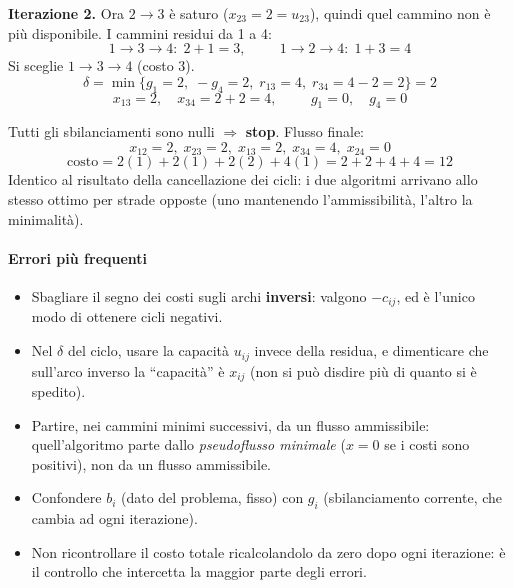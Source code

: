 \documentclass[12pt]{extarticle} %
\begin{document}
\noindent\textbf{Iterazione 2.} Ora $2\to3$ è saturo ($x_{23}=2=u_{23}$), quindi quel cammino non è più disponibile. I cammini residui da 1 a 4:
\[
1\to3\to4:\; 2+1 = 3, \hspace{1cm} 1\to2\to4:\; 1+3 = 4
\]
Si sceglie $1\to3\to4$ (costo 3).
\[
\delta = \min\{g_1 = 2,\; -g_4 = 2,\; r_{13} = 4,\; r_{34} = 4-2 = 2\} = 2
\]
\[
x_{13} = 2, \quad x_{34} = 2+2 = 4, \hspace{1cm} g_1 = 0, \quad g_4 = 0
\]
\begin{center}
\end{center}
Tutti gli sbilanciamenti sono nulli $\Rightarrow$ \textbf{stop}. Flusso finale:
\[
x_{12}=2,\; x_{23}=2,\; x_{13}=2,\; x_{34}=4,\; x_{24}=0
\]
\[
\text{costo} = 2(1) + 2(1) + 2(2) + 4(1) = 2 + 2 + 4 + 4 = 12
\]
Identico al risultato della cancellazione dei cicli: i due algoritmi arrivano allo stesso ottimo per strade opposte (uno mantenendo l'ammissibilità, l'altro la minimalità).

\paragraph{Errori più frequenti}
\begin{itemize}
    \item Sbagliare il segno dei costi sugli archi \textbf{inversi}: valgono $-c_{ij}$, ed è l'unico modo di ottenere cicli negativi.
    \item Nel $\delta$ del ciclo, usare la capacità $u_{ij}$ invece della residua, e dimenticare che sull'arco inverso la ``capacità'' è $x_{ij}$ (non si può disdire più di quanto si è spedito).
    \item Partire, nei cammini minimi successivi, da un flusso ammissibile: quell'algoritmo parte dallo \emph{pseudoflusso minimale} ($x=0$ se i costi sono positivi), non da un flusso ammissibile.
    \item Confondere $b_i$ (dato del problema, fisso) con $g_i$ (sbilanciamento corrente, che cambia ad ogni iterazione).
    \item Non ricontrollare il costo totale ricalcolandolo da zero dopo ogni iterazione: è il controllo che intercetta la maggior parte degli errori.
\end{itemize}
\end{document}
